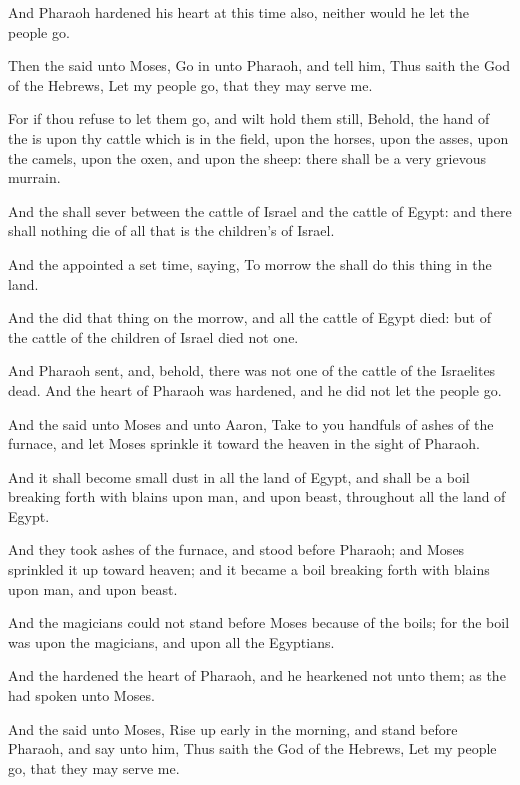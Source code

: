 \Verse And Pharaoh hardened his heart at this time also, neither would he let the people go.

\Chapter
\Verse Then the \LORD said unto Moses, Go in unto Pharaoh, and tell him, Thus saith the \LORD God of the Hebrews, Let my people go, that they may serve me.

\Verse For if thou refuse to let them go, and wilt hold them still, \Verse Behold, the hand of the \LORD is upon thy cattle which is in the field, upon the horses, upon the asses, upon the camels, upon the oxen, and upon the sheep: there shall be a very grievous murrain.

\Verse And the \LORD shall sever between the cattle of Israel and the cattle of Egypt: and there shall nothing die of all that is the children's of Israel.

\Verse And the \LORD appointed a set time, saying, To morrow the \LORD shall do this thing in the land.

\Verse And the \LORD did that thing on the morrow, and all the cattle of Egypt died: but of the cattle of the children of Israel died not one.

\Verse And Pharaoh sent, and, behold, there was not one of the cattle of the Israelites dead. And the heart of Pharaoh was hardened, and he did not let the people go.

\Verse And the \LORD said unto Moses and unto Aaron, Take to you handfuls of ashes of the furnace, and let Moses sprinkle it toward the heaven in the sight of Pharaoh.

\Verse And it shall become small dust in all the land of Egypt, and shall be a boil breaking forth with blains upon man, and upon beast, throughout all the land of Egypt.

\Verse And they took ashes of the furnace, and stood before Pharaoh; and Moses sprinkled it up toward heaven; and it became a boil breaking forth with blains upon man, and upon beast.

\Verse And the magicians could not stand before Moses because of the boils; for the boil was upon the magicians, and upon all the Egyptians.

\Verse And the \LORD hardened the heart of Pharaoh, and he hearkened not unto them; as the \LORD had spoken unto Moses.

\Verse And the \LORD said unto Moses, Rise up early in the morning, and stand before Pharaoh, and say unto him, Thus saith the \LORD God of the Hebrews, Let my people go, that they may serve me.

